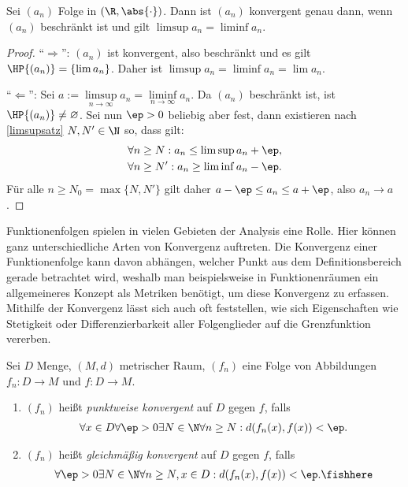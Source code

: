 \begin{prop}
\label{prop:1.11}
Sei $(a_n)$ Folge in $(\R,\abs{\cdot})$. Dann ist $(a_n)$ konvergent genau
dann, wenn $(a_n)$ beschränkt ist und gilt $\limsup a_n = \liminf a_n$.\fishhere
\end{prop}
\begin{proof}
``$\Rightarrow$'': $(a_n)$ ist konvergent, also beschränkt und es
gilt $\HP{(a_n)} = \{\lim a_n\}$. Daher ist $\limsup a_n = \liminf a_n = \lim
a_n$.

``$\Leftarrow$'': Sei $a:= \limsup\limits_{n\to\infty} a_n =
\liminf\limits_{n\to\infty} a_n$. Da $(a_n)$ beschränkt ist, ist
$\HP{(a_n)}\neq\varnothing$. Sei nun $\ep > 0 $ beliebig aber fest, dann
existieren nach \ref{limsupsatz} $N,N'\in\N$ so, dass gilt:
\begin{align*}
&\forall n\ge N: a_n \le \limsup a_n + \ep,\\
&\forall n\ge N': a_n \ge \liminf a_n - \ep.
\end{align*}
Für alle $n \ge N_0 = \max\{N,N'\}$ gilt daher $a - \ep \le a_n \le a + \ep$,
also $a_n\to a$.\qedhere
\end{proof}

Funktionenfolgen spielen in vielen Gebieten der Analysis eine Rolle. Hier
können ganz unterschiedliche Arten von Konvergenz auftreten. Die
Konvergenz einer Funktionenfolge kann davon abhängen, welcher Punkt aus dem
Definitionsbereich gerade betrachtet wird, weshalb man beispielsweise in
Funktionenräumen ein allgemeineres Konzept als Metriken benötigt, um diese
Konvergenz zu erfassen. Mithilfe der Konvergenz lässt sich auch oft
feststellen, wie sich Eigenschaften wie Stetigkeit oder Differenzierbarkeit
aller Folgenglieder auf die Grenzfunktion vererben.

\begin{defn}
\label{defn:1.12}
Sei $D$ Menge, $(M,d)$
metrischer Raum, $(f_n)$ eine Folge von Abbildungen $f_n: D\to M$ und $f: D\to M$.
\begin{enumerate}
  \item $(f_n)$ heißt \emph{punktweise konvergent} auf $D$ gegen $f$, falls
  \begin{align*}
  \forall x\in D \forall \ep > 0 \exists N\in \N \forall n\ge N :
  d(f_n(x), f(x)) < \ep.
  \end{align*}
  \item $(f_n)$ heißt \emph{gleichmäßig konvergent} auf $D$ gegen $f$, falls
  \begin{align*}
  \forall \ep > 0 \exists N\in\N \forall n\ge N, x\in D  : d(f_n(x), f(x)) <
  \ep.\fishhere
  \end{align*}
\end{enumerate}
\end{defn}

